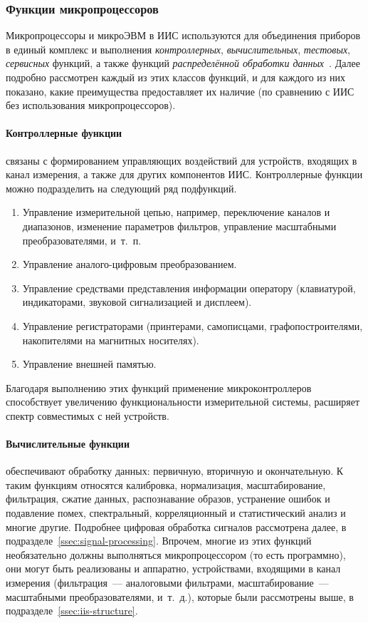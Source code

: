 \documentclass[a4paper, 14pt, titlepage]{extarticle}
\newcommand{\term}[1]{\emph{#1}}
\let\oldparagraph\paragraph
\renewcommand{\paragraph}[1]{\oldparagraph{\indent #1}}
\begin{document}
  \subsubsection{Функции микропроцессоров}

  Микропроцессоры и микроЭВМ в ИИС используются для объединения приборов в единый комплекс и выполнения
  \term{контроллерных}, \term{вычислительных}, \term{тестовых}, \term{сервисных} функций, а также
  функций \term{распределённой обработки данных}~\cite[с.~421]{rannev-meas-tech}.
  Далее подробно рассмотрен каждый из этих классов функций, и для каждого из них показано, какие
  преимущества предоставляет их наличие (по сравнению с ИИС без использования микропроцессоров).

  \paragraph{Контроллерные функции} связаны с формированием управляющих воздействий для устройств,
  входящих в канал измерения, а также для других компонентов ИИС. Контроллерные функции можно
  подразделить на следующий ряд подфункций.
  \begin{enumerate}
    \item Управление измерительной цепью, например, переключение каналов и диапазонов, изменение
      параметров фильтров, управление масштабными преобразователями, и~т.~п.
    \item Управление аналого-цифровым преобразованием.
    \item Управление средствами представления информации оператору (клавиатурой, индикаторами,
      звуковой сигнализацией и дисплеем).
    \item Управление регистраторами (принтерами, самописцами, графопостроителями,
      накопителями на магнитных носителях).
    \item Управление внешней памятью.
  \end{enumerate}

  Благодаря выполнению этих функций применение микроконтроллеров способствует увеличению
  функциональности измерительной системы, расширяет спектр совместимых с ней устройств.

  \paragraph{Вычислительные функции} обеспечивают обработку данных: первичную, вторичную и
  окончательную. К таким функциям относятся калибровка, нормализация, масштабирование, фильтрация,
  сжатие данных, распознавание образов, устранение ошибок и подавление помех, спектральный,
  корреляционный и статистический анализ и многие другие. Подробнее цифровая обработка сигналов
  рассмотрена далее, в подразделе~\ref{ssec:signal-processing}. Впрочем, многие из этих функций
  необязательно должны выполняться микропроцессором (то есть программно), они могут быть реализованы
  и аппаратно, устройствами, входящими в канал измерения (фильтрация~--- аналоговыми фильтрами,
  масштабирование~--- масштабными преобразователями, и~т.~д.), которые были рассмотрены выше, в
  подразделе~\ref{ssec:iis-structure}.
\end{document}
